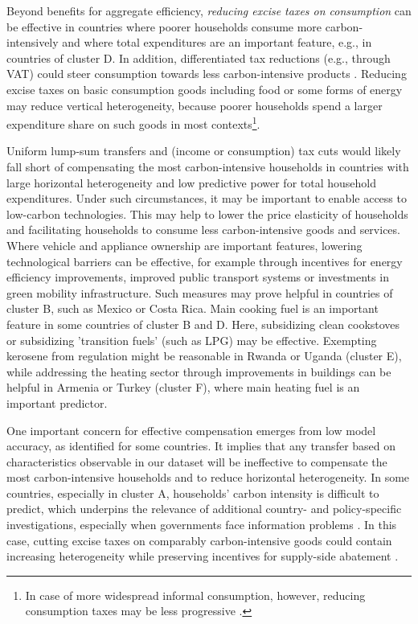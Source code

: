 \documentclass[12pt, a4paper]{article}
\begin{document}
Beyond benefits for aggregate efficiency, \textit{reducing excise taxes on consumption} can be effective in countries where poorer households consume more carbon-intensively and where total expenditures are an important feature, e.g., in countries of cluster D. In addition, differentiated tax reductions (e.g., through VAT) could steer consumption towards less carbon-intensive products \autocite{Klenert.2023}. Reducing excise taxes on basic consumption goods including food or some forms of energy may reduce vertical heterogeneity, because poorer households spend a larger expenditure share on such goods in most contexts\footnote{In case of more widespread informal consumption, however, reducing consumption taxes may be less progressive \autocite{Bachas.2020}.}. 

Uniform lump-sum transfers and (income or consumption) tax cuts would likely fall short of compensating the most carbon-intensive households in countries with large horizontal heterogeneity and low predictive power for total household expenditures. Under such circumstances, it may be important to enable access to low-carbon technologies. This may help to lower the price elasticity of households and facilitating households to consume less carbon-intensive goods and services. Where vehicle and appliance ownership are important features, lowering technological barriers can be effective, for example through incentives for energy efficiency improvements, improved public transport systems or investments in green mobility infrastructure. Such measures may prove helpful in countries of cluster B, such as Mexico or Costa Rica. %
Main cooking fuel is an important feature in some countries of cluster B and D. Here, subsidizing clean cookstoves or subsidizing 'transition fuels' (such as LPG) may be effective. Exempting kerosene from regulation might be reasonable in Rwanda or Uganda (cluster E), while addressing the heating sector through improvements in buildings can be helpful in Armenia or Turkey (cluster F), where main heating fuel is an important predictor. %

One important concern for effective compensation emerges from low model accuracy, as identified for some countries. It implies that any transfer based on characteristics observable in our dataset will be ineffective to compensate the most carbon-intensive households and to reduce horizontal heterogeneity. In some countries, especially in cluster A, households' carbon intensity is difficult to predict, which underpins the relevance of additional country- and policy-specific investigations, especially when governments face information problems \autocite{Mirrlees.1971}. In this case, cutting excise taxes on comparably carbon-intensive goods could contain increasing heterogeneity while preserving incentives for supply-side abatement \autocite{Goulder.2008}.
\end{document}
